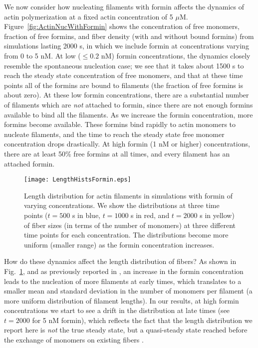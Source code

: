 \documentclass[11pt]{article}
\begin{document}
We now consider how nucleating filaments with formin affects the dynamics of actin polymerization at a fixed actin concentration of 5 $\mu$M. Figure\ \ref{fig:ActinNucWithFormin} shows the concentration of free monomers, fraction of free formins, and fiber density (with and without bound formins) from simulations lasting 2000 s, in which we include formin at concentrations varying from 0 to 5 nM. At low ($\leq 0.2$ nM) formin concentrations, the dynamics closely resemble the spontaneous nucleation case; we see that it takes about 1500 s to reach the steady state concentration of free monomers, and that at these time points all of the formins are bound to filaments (the fraction of free formins is about zero). At these low formin concentrations, there are a substantial number of filaments which are \emph{not} attached to formin, since there are not enough formins available to bind all the filaments. As we increase the formin concentration, more formins become available. These formins bind rapidly to actin monomers to nucleate filaments, and the time to reach the steady state free monomer concentration drops drastically. At high formin (1 nM or higher) concentrations, there are at least 50\% free formins at all times, and every filament has an attached formin. 

\begin{figure}
\centering
\texttt{[image: LengthHistsFormin.eps]}
\caption{\label{fig:HistsWithFormin}Length distribution for actin filaments in simulations with formin of varying concentrations. We show the distributions at three time points ($t=500$ s in blue, $t=1000$ s in red, and $t=2000$ s in yellow) of fiber sizes (in terms of the number of monomers) at three different time points for each concentration. The distributions become more uniform (smaller range) as the formin concentration increases.}
\end{figure}

How do these dynamics affect the length distribution of fibers? As shown in Fig.\ \ref{fig:HistsWithFormin}, and as previously reported in \cite{banerjee2022emergence}, an increase in the formin concentration leads to the nucleation of more filaments at early times, which translates to a smaller mean and standard deviation in the number of monomers per filament (a more uniform distribution of filament lengths). In our results, at high formin concentrations we start to see a drift in the distribution at late times (see $t=2000$ for 5 nM formin), which reflects the fact that the length distribution we report here is \emph{not} the true steady state, but a quasi-steady state reached before the exchange of monomers on existing fibers \cite{mohapatra2017limiting}.
\end{document}
